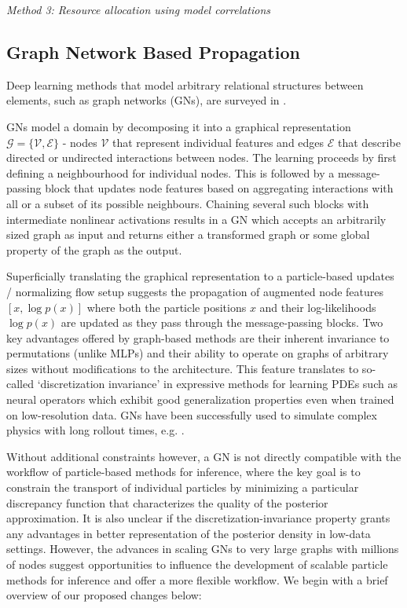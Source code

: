 \documentclass[12pt]{article}
\renewcommand{\[}{\left[}
\renewcommand{\]}{\right]}
\renewcommand{\(}{\left(}
\renewcommand{\)}{\right)}
\newcommand{\CE}{\mathcal{E}}
\newcommand{\CG}{\mathcal{G}}
\newcommand{\CV}{\mathcal{V}}
\begin{document}
\noindent \emph{Method 3: Resource allocation using model correlations}

\subsection{Graph Network Based Propagation}
Deep learning methods that model arbitrary relational structures between elements, such as graph networks (GNs), are surveyed in \cite{battaglia_relational_2018}. 

GNs model a domain by decomposing it into a graphical representation $\CG=\{\CV, \CE\}$ - nodes $\CV$ that represent individual features and edges $\CE$ that describe directed or undirected interactions between nodes. 
The learning proceeds by first defining a neighbourhood for individual nodes. This is followed by a message-passing block that updates node features based on aggregating interactions with all or a subset of its possible neighbours. Chaining several such blocks with intermediate nonlinear activations results in a GN which accepts an arbitrarily sized graph as input and returns either a transformed graph or some global property of the graph as the output. 

Superficially translating the graphical representation to a particle-based updates / normalizing flow setup suggests the propagation of augmented node features $[x, \log p(x)]$ where both the particle positions $x$ and their log-likelihoods $\log p(x)$ are updated as they pass through the message-passing blocks. Two key advantages offered by graph-based methods are their inherent invariance to permutations (unlike MLPs) and their ability to operate on graphs of arbitrary sizes without modifications to the architecture. 
This feature translates to so-called `discretization invariance' in expressive methods for learning PDEs such as neural operators \citep{Li2020} which exhibit good generalization properties even when trained on low-resolution data. GNs have been successfully used to simulate complex physics with long rollout times, e.g. \cite{sanchez-gonzalez_learning_2020}.

Without additional constraints however, a GN is not directly compatible with the workflow of particle-based methods for inference, where the key goal is to constrain the transport of individual particles by minimizing a particular discrepancy function that characterizes the quality of the posterior approximation. 
It is also unclear if the discretization-invariance property grants any advantages in better representation of the posterior density in low-data settings. 
However, the advances in scaling GNs to very large graphs with millions of nodes suggest opportunities to influence the development of scalable particle methods for inference and offer a more flexible workflow. 
We begin with a brief overview of our proposed changes below:
\end{document}
